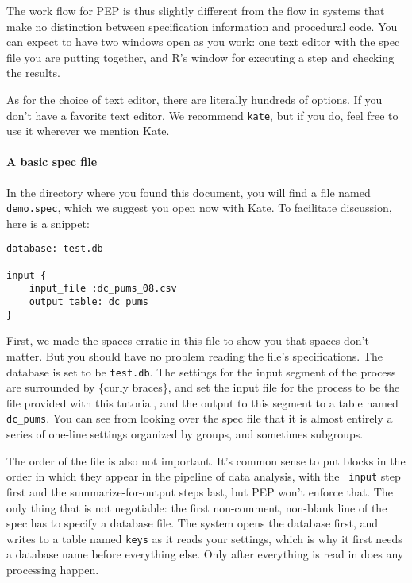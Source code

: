 \documentclass{article}
\begin{document}
The work flow for PEP is thus slightly different from the flow in systems that make no
distinction between specification information and procedural code.  You can expect to
have two windows open as you work: one text editor with the spec file you are putting
together, and R's window for executing a step and checking the results.

As for the choice of text editor, there are literally hundreds of options. If you don't have a favorite text editor,
We recommend {\tt kate}, but if you do, feel free to use it wherever we mention Kate.

\paragraph{A basic spec file}

In the directory where you found this document, you will find a file named
{\tt demo.spec}, which we suggest you open now with Kate.  To facilitate discussion, here is a snippet:

\begin{specbit} 
\begin{verbatim}
database: test.db

input {
	input_file :dc_pums_08.csv
	output_table: dc_pums
}
\end{verbatim}
\end{specbit} 

First, we made the spaces erratic in this file to show you that spaces don't matter. But
you should have no problem reading the file's specifications. The database is set to
be {\tt test.db}. The settings for the input segment of the process are surrounded by
\{curly braces\}, and set the input file for the process to be the file provided with
this tutorial, and the output to this segment to a table named
{\tt dc\_pums}. You can see from looking over the spec file that it is almost entirely a
series of one-line settings organized by groups, and sometimes subgroups.

The order of the file is also not important. It's common sense to put blocks in
the order in which they appear in the pipeline of data analysis, with the {\tt
input} step first and the summarize-for-output steps last, but PEP won't
enforce that.
The only thing that is not negotiable: the first non-comment, non-blank line of 
the spec has to specify a database file. The system opens the database first,
and writes to a table named {\tt keys} as it reads your settings, which is why
it first needs a database name before everything else. Only after
everything is read in does any processing happen. 
\end{document}
